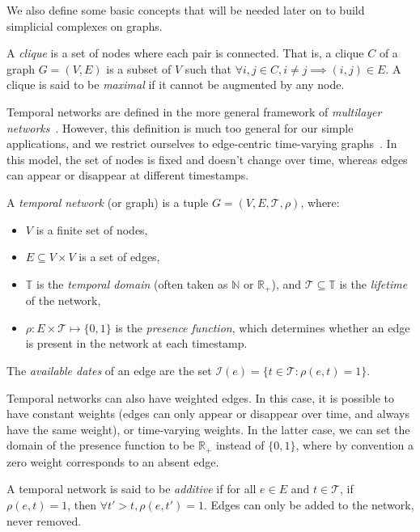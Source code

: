 \documentclass[a4paper,11pt,openany,extrafontsizes]{memoir}
\begin{document}
We also define some basic concepts that will be needed later on to
build simplicial complexes on graphs.

\begin{defn}[Clique]
  A \emph{clique} is a set of nodes where each pair is connected. That
  is, a clique $C$ of a graph $G = (V,E)$ is a subset of $V$ such that
  $\forall i,j\in C, i \neq j \implies (i,j)\in E$. A clique is said
  to be \emph{maximal} if it cannot be augmented by any node.
\end{defn}

Temporal networks are defined in the more general framework of
\emph{multilayer networks}~\cite{kivela_multilayer_2014}. However,
this definition is much too general for our simple applications, and
we restrict ourselves to edge-centric time-varying
graphs~\cite{casteigts_time-varying_2012}. In this model, the set of
nodes is fixed and doesn't change over time, whereas edges can appear
or disappear at different timestamps.

\begin{defn}
  A \emph{temporal network} (or graph) is a tuple
  $G = (V, E, \mathcal{T}, \rho)$, where:
  \begin{itemize}
  \item $V$ is a finite set of nodes,
  \item $E\subseteq V\times V$ is a set of edges,
  \item $\mathbb{T}$ is the \emph{temporal domain} (often taken as
    $\mathbb{N}$ or $\mathbb{R}_+$), and
    $\mathcal{T}\subseteq\mathbb{T}$ is the \emph{lifetime} of the
    network,
  \item $\rho: E\times\mathcal{T}\mapsto\{0,1\}$ is the \emph{presence
      function}, which determines whether an edge is present in the
    network at each timestamp.
  \end{itemize}
  The \emph{available dates} of an edge are the set
  $\mathcal{I}(e) = \{t\in\mathcal{T}: \rho(e,t)=1\}$.
\end{defn}

Temporal networks can also have weighted edges. In this case, it is
possible to have constant weights (edges can only appear or disappear
over time, and always have the same weight), or time-varying
weights. In the latter case, we can set the domain of the presence
function to be $\mathbb{R}_+$ instead of $\{0,1\}$, where by
convention a zero weight corresponds to an absent edge.

\begin{defn}
  A temporal network is said to be \emph{additive} if for all $e\in E$
  and $t\in\mathcal{T}$, if $\rho(e,t)=1$, then
  $\forall t'>t, \rho(e, t') = 1$. Edges can only be added to the
  network, never removed.
\end{defn}
\end{document}
